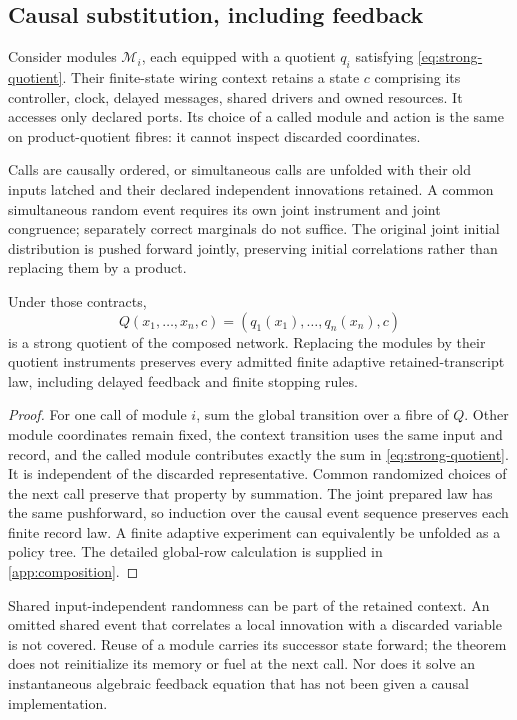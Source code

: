 \subsection{Causal substitution, including feedback}
Consider modules \(\mathcal M_i\), each equipped with a quotient \(q_i\) satisfying \cref{eq:strong-quotient}. Their finite-state wiring context retains a state \(c\) comprising its controller, clock, delayed messages, shared drivers and owned resources. It accesses only declared ports. Its choice of a called module and action is the same on product-quotient fibres: it cannot inspect discarded coordinates.

Calls are causally ordered, or simultaneous calls are unfolded with their old inputs latched and their declared independent innovations retained. A common simultaneous random event requires its own joint instrument and joint congruence; separately correct marginals do not suffice. The original joint initial distribution is pushed forward jointly, preserving initial correlations rather than replacing them by a product.

\begin{theorem}\label{p2-17}
Under those contracts,
\begin{equation}\label{eq:global-q}
 Q(x_1,\ldots,x_n,c)=(q_1(x_1),\ldots,q_n(x_n),c)
\end{equation}
is a strong quotient of the composed network. Replacing the modules by their quotient instruments preserves every admitted finite adaptive retained-transcript law, including delayed feedback and finite stopping rules.
\end{theorem}
\begin{proof}
For one call of module \(i\), sum the global transition over a fibre of \(Q\). Other module coordinates remain fixed, the context transition uses the same input and record, and the called module contributes exactly the sum in \cref{eq:strong-quotient}. It is independent of the discarded representative. Common randomized choices of the next call preserve that property by summation. The joint prepared law has the same pushforward, so induction over the causal event sequence preserves each finite record law. A finite adaptive experiment can equivalently be unfolded as a policy tree. The detailed global-row calculation is supplied in \cref{app:composition}.
\end{proof}
Shared input-independent randomness can be part of the retained context. An omitted shared event that correlates a local innovation with a discarded variable is not covered. Reuse of a module carries its successor state forward; the theorem does not reinitialize its memory or fuel at the next call. Nor does it solve an instantaneous algebraic feedback equation that has not been given a causal implementation.

